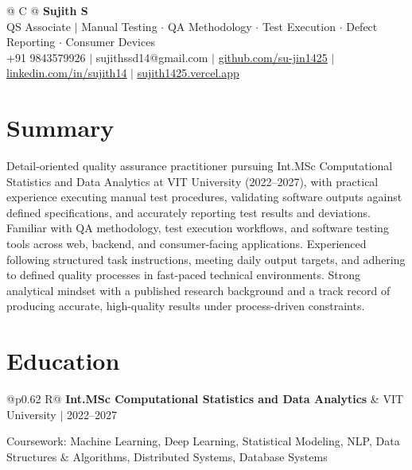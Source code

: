 \documentclass[a4paper,10pt]{article}
\newcommand{\ulink}[2]{\href{#1}{\uline{#2}}}
\newcommand{\subheading}[1]{{\color[HTML]{0A0A0A}\fontsize{12}{14}\selectfont\bfseries #1}}
\newcommand{\meta}[1]{{\color[HTML]{5C5C5C}\fontsize{10.5}{12.5}\selectfont #1}}
\begin{document}
\pagestyle{empty}

\begin{tabularx}{\linewidth}{@{} C @{}}
{\color[HTML]{000000}\fontsize{30}{35}\selectfont\bfseries Sujith S} \\[5pt]
{\fontsize{10.5}{12.5}\selectfont\color[HTML]{3A3A3A}
QS Associate $|$ Manual Testing $\cdot$ QA Methodology $\cdot$ Test Execution $\cdot$ Defect Reporting $\cdot$ Consumer Devices} \\[6pt]
{\fontsize{10.5}{12.5}\selectfont\textcolor[HTML]{3A3A3A}{
+91 9843579926 $|$
sujithssd14@gmail.com $|$
\ulink{https://github.com/su-jin1425}{github.com/su-jin1425} $|$
\ulink{https://linkedin.com/in/sujith14}{linkedin.com/in/sujith14} $|$
\ulink{https://sujith1425.vercel.app}{sujith1425.vercel.app}}}
\end{tabularx}

\vspace{2pt}

\section{Summary}
\vspace{5pt}
{\color[HTML]{0A0A0A}\fontsize{11}{14}\selectfont
Detail-oriented quality assurance practitioner pursuing Int.MSc Computational Statistics and Data Analytics at VIT University (2022--2027), with practical experience executing manual test procedures, validating software outputs against defined specifications, and accurately reporting test results and deviations. Familiar with QA methodology, test execution workflows, and software testing tools across web, backend, and consumer-facing applications. Experienced following structured task instructions, meeting daily output targets, and adhering to defined quality processes in fast-paced technical environments. Strong analytical mindset with a published research background and a track record of producing accurate, high-quality results under process-driven constraints.}

\vspace{2pt}

\section{Education}
\vspace{2pt}

\begin{tabularx}{\linewidth}{@{}p{0.62\linewidth} R@{}}
\subheading{Int.MSc Computational Statistics and Data Analytics} & \meta{VIT University $|$ 2022--2027}
\end{tabularx}
\vspace{1pt}
{\color[HTML]{3A3A3A}\fontsize{11}{14}\selectfont Coursework: Machine Learning, Deep Learning, Statistical Modeling, NLP, Data Structures \& Algorithms, Distributed Systems, Database Systems}
\end{document}
